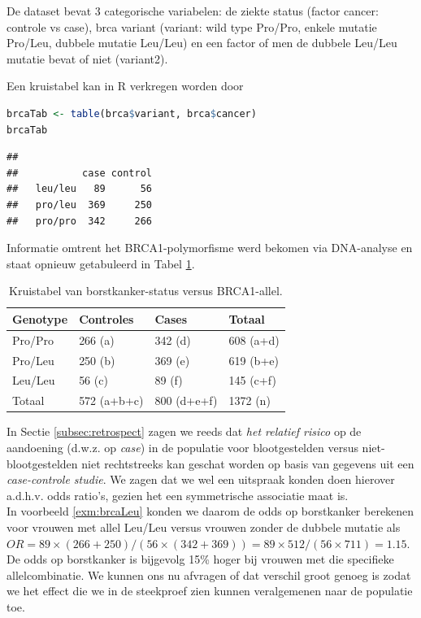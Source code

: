 \documentclass[
  12pt,dutch,coursenotes]{book}
\begin{document}
De dataset bevat 3 categorische variabelen: de ziekte status (factor cancer: controle vs case), brca variant (variant: wild type Pro/Pro, enkele mutatie Pro/Leu, dubbele mutatie Leu/Leu) en een factor of men de dubbele Leu/Leu mutatie bevat of niet (variant2).

Een kruistabel kan in R verkregen worden door

\begin{lstlisting}[language=R]
brcaTab <- table(brca$variant, brca$cancer)
brcaTab
\end{lstlisting}

\begin{lstlisting}
##          
##           case control
##   leu/leu   89      56
##   pro/leu  369     250
##   pro/pro  342     266
\end{lstlisting}

Informatie omtrent het BRCA1-polymorfisme werd bekomen via DNA-analyse en staat opnieuw getabuleerd in Tabel \ref{tab:leu3}.

\begin{table}

\caption{\label{tab:leu3}Kruistabel van borstkanker-status versus BRCA1-allel.}
\centering
\begin{tabular}[t]{llll}
\toprule
Genotype & Controles & Cases & Totaal\\
\midrule
Pro/Pro & 266 (a) & 342 (d) & 608 (a+d)\\
Pro/Leu & 250 (b) & 369 (e) & 619 (b+e)\\
Leu/Leu & 56 (c) & 89 (f) & 145 (c+f)\\
Totaal & 572 (a+b+c) & 800 (d+e+f) & 1372 (n)\\
\bottomrule
\end{tabular}
\end{table}

In Sectie \ref{subsec:retrospect} zagen we reeds dat \emph{het relatief risico} op de aandoening (d.w.z. op \emph{case})
in de populatie voor blootgestelden versus niet-blootgestelden niet rechtstreeks kan geschat worden op basis van gegevens uit een \emph{case-controle studie}.
We zagen dat we wel een uitspraak konden doen hierover a.d.h.v. odds ratio's, gezien het een symmetrische associatie maat is.\\
In voorbeeld \ref{exm:brcaLeu} konden we daarom de odds op borstkanker berekenen voor vrouwen met allel Leu/Leu
versus vrouwen zonder de dubbele mutatie als \(OR=89\times (266+250)/(56\times (342+369))=89\times 512/(56 \times 711)=1.15\).
De odds op borstkanker is bijgevolg 15\% hoger bij vrouwen met die specifieke allelcombinatie.
We kunnen ons nu afvragen of dat verschil groot genoeg is zodat we het effect die we in de steekproef zien kunnen veralgemenen naar de populatie toe.
\end{document}
